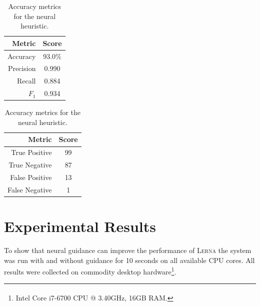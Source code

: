 \documentclass{llncs}
\newcommand{\lerna}{\textsc{Lerna}}
\begin{document}
\begin{table}[t]
	\caption{Accuracy metrics for the neural heuristic.}
	\centering
	\begin{tabular}{r | c}
		\textbf{Metric} & \textbf{Score}\\
		\hline
		Accuracy & 93.0\%\\
		Precision&0.990\\	
		Recall&0.884\\
		\(F_1\)&0.934\\			
	\end{tabular}
	\quad
	\begin{tabular}{r | c}
		\textbf{Metric} & \textbf{Score}\\
		\hline
		True Positive&99\\
		True Negative&87\\
		False Positive&13\\		
		False Negative&1\\
	\end{tabular}	
	\label{table:network-evaluation}
\end{table}
\section{Experimental Results}
\label{section:results}

To show that neural guidance can improve the performance of \lerna{} the system was run with and without guidance for 10 seconds on all available CPU cores.
All results were collected on commodity desktop hardware\footnote{Intel\textsuperscript{\textregistered} Core\textsuperscript{\texttrademark} i7-6700 CPU @ 3.40GHz, 16GB RAM.}.
\end{document}
